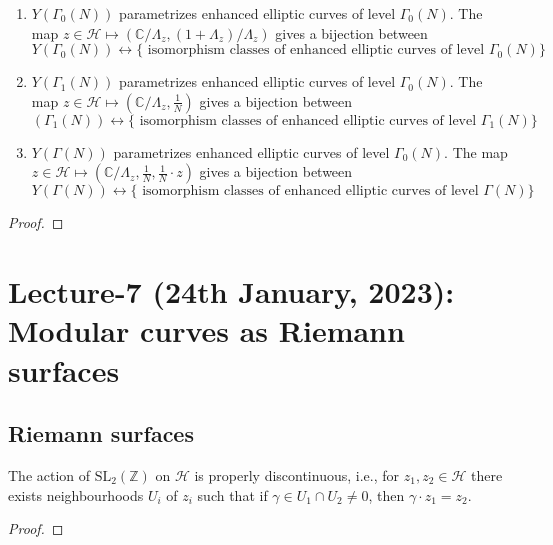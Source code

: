 \documentclass[oneside, 12pt]{scrbook}
\newcommand{\CC}{\mathbb C}
\newcommand{\ZZ}{\mathbb Z}
\newcommand{\SL}{\mathrm{SL}}
\newcommand{\Hh}{\mathcal{H}}
\theoremstyle{theorem}
\begin{document}
\begin{proposition}
\begin{enumerate}
\item $Y(\Gamma_{0}(N))$ parametrizes enhanced elliptic curves of level $\Gamma_{0}(N)$. The map $z\in \Hh \mapsto \left( \CC/\Lambda_{z} , \left( 1 + \Lambda_{z} \right)/\Lambda_{z}\right)$ gives a bijection between 
$$Y (\Gamma_{0}(N)) \leftrightarrow \{\text{ isomorphism classes of enhanced elliptic curves of level } \Gamma_{0}(N)\}$$
\item $Y(\Gamma_{1}(N))$ parametrizes enhanced elliptic curves of level $\Gamma_{0}(N)$. The map $z\in \Hh \mapsto \left( \CC/\Lambda_{z} , \frac{1}{N} \right)$ gives a bijection between 
$$ (\Gamma_{1}(N)) \leftrightarrow \{\text{ isomorphism classes of enhanced elliptic curves of level } \Gamma_{1}(N)\}$$
\item $Y(\Gamma(N))$ parametrizes enhanced elliptic curves of level $\Gamma_{0}(N)$. The map $z\in \Hh \mapsto \left( \CC/\Lambda_{z} , \frac{1}{N} , \frac{1}{N} \cdot z \right)$ gives a bijection between 
$$Y (\Gamma(N)) \leftrightarrow \{\text{ isomorphism classes of enhanced elliptic curves of level } \Gamma(N)\}$$
\end{enumerate}
\end{proposition}

\begin{proof}

\end{proof}

\chapter{Lecture-7 (24th January, 2023): Modular curves as Riemann surfaces}

\section{Riemann surfaces}

\begin{proposition}
The action of $\SL_{2}(\ZZ)$ on $\Hh$ is properly discontinuous, i.e., for $z_{1},z_{2} \in \Hh$ there exists neighbourhoods $U_{i}$ of $z_{i}$ such that if $\gamma \in U_{1}\cap U_{2} \neq 0$, then $\gamma \cdot z_{1} = z_{2}$.
\end{proposition}

\begin{proof}

\end{proof}
\end{document}
